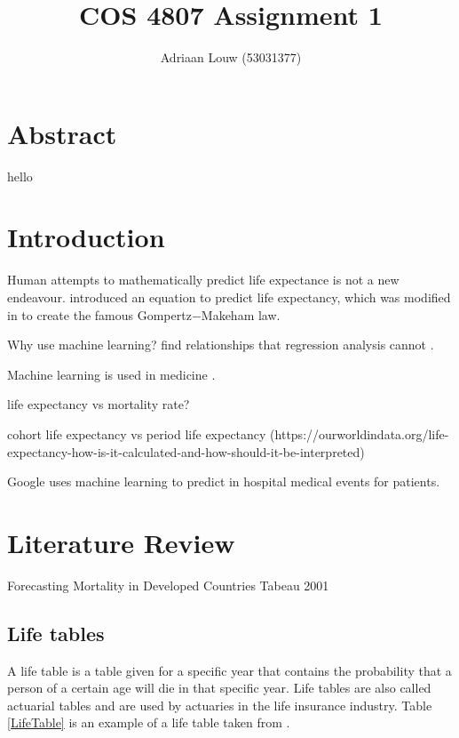 \documentclass[10pt,a4paper]{article}
\title{COS 4807 Assignment 1}
\author{Adriaan Louw (53031377)}
\begin{document}
\maketitle

\tableofcontents

\listoffigures

\listoftables


\section{Abstract}
hello
\section{Introduction}

Human attempts to mathematically predict life expectance is not a new endeavour. \cite{Gompertz} introduced an equation to predict life expectancy, which was modified in \cite{Makeham1860} to create the famous Gompertz$-$Makeham law.


Why use machine learning? find relationships that regression analysis cannot \cite{Chen2017}.

Machine learning is used in medicine \cite{Chen2017}.

life expectancy vs mortality rate?

cohort life expectancy vs period life expectancy (https://ourworldindata.org/life-expectancy-how-is-it-calculated-and-how-should-it-be-interpreted)

\cite{Rajkomar2018} Google uses machine learning to predict in hospital medical events for patients. 

\section{Literature Review}

Forecasting Mortality in Developed Countries Tabeau 2001

\subsection{Life tables}

A life table is a table given for a specific year that contains the probability that a person of a certain age will die in that specific year. Life tables are also called actuarial tables and are used by actuaries in the life insurance industry. Table \ref{LifeTable} is an example of a life table taken from \cite{Arias2007}.
\end{document}
